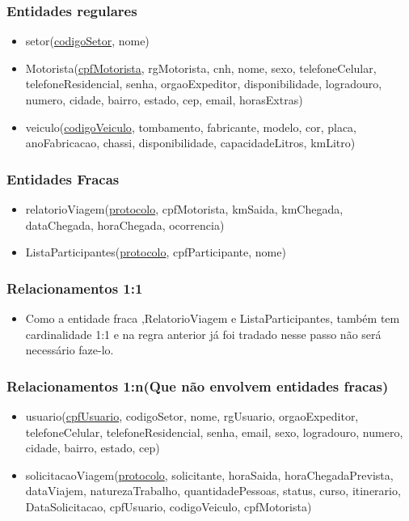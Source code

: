 \documentclass[11pt]{article}
\begin{document}
\subsubsection{Entidades regulares}
\begin{itemize}

\item setor(\underline{codigoSetor}, nome)

\item Motorista(\underline{cpfMotorista}, rgMotorista, cnh, nome, sexo, telefoneCelular, telefoneResidencial, senha, orgaoExpeditor, disponibilidade, logradouro, numero, cidade, bairro, estado, cep, email, horasExtras)

\item veiculo(\underline{codigoVeiculo}, tombamento, fabricante, modelo, cor, placa, anoFabricacao, chassi, disponibilidade, capacidadeLitros, kmLitro)
\end{itemize}

\subsubsection{Entidades Fracas}
\begin{itemize}

\item relatorioViagem(\underline{protocolo}, cpfMotorista, kmSaida, kmChegada, dataChegada, horaChegada, ocorrencia)

\item ListaParticipantes(\underline{protocolo}, cpfParticipante, nome)

\end{itemize}

\subsubsection{Relacionamentos 1:1}
\begin{itemize}

\item Como a entidade fraca ,RelatorioViagem e ListaParticipantes, também tem cardinalidade 1:1 e na regra anterior já foi tradado nesse passo não será necessário faze-lo.
\end{itemize}

\subsubsection{Relacionamentos 1:n(Que não envolvem entidades fracas)}
\begin{itemize}

\item usuario(\underline{cpfUsuario}, codigoSetor, nome, rgUsuario, orgaoExpeditor, telefoneCelular, telefoneResidencial, senha,
email, sexo, logradouro, numero, cidade, bairro, estado, cep)

\item solicitacaoViagem(\underline{protocolo}, solicitante, horaSaida, horaChegadaPrevista, dataViajem, naturezaTrabalho, quantidadePessoas, status, curso, itinerario, DataSolicitacao, cpfUsuario,  codigoVeiculo, cpfMotorista)

\end{itemize}
\end{document}
